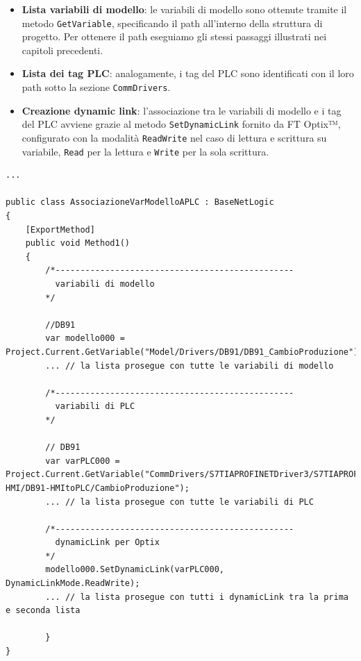 \begin{itemize}
    \item \textbf{Lista variabili di modello}: le variabili di modello sono ottenute tramite il metodo \verb|GetVariable|, specificando il path all'interno della struttura di progetto. Per ottenere il path eseguiamo gli stessi passaggi illustrati nei capitoli precedenti.
    \item \textbf{Lista dei tag PLC}: analogamente, i tag del PLC sono identificati con il loro path sotto la sezione \verb|CommDrivers|.
    \item \textbf{Creazione dynamic link}: l'associazione tra le variabili di modello e i tag del PLC avviene grazie al metodo \verb|SetDynamicLink| fornito da FT Optix™, configurato con la modalità \verb|ReadWrite| nel caso di lettura e scrittura su variabile, \verb|Read| per la lettura e \verb|Write| per la sola scrittura.
\end{itemize}
\begin{verbatim}
...

public class AssociazioneVarModelloAPLC : BaseNetLogic
{
    [ExportMethod]
    public void Method1()
    {
        /*------------------------------------------------
          variabili di modello 
        */
        
        //DB91
        var modello000 = Project.Current.GetVariable("Model/Drivers/DB91/DB91_CambioProduzione");
        ... // la lista prosegue con tutte le variabili di modello

        /*------------------------------------------------
          variabili di PLC
        */

        // DB91
        var varPLC000 = Project.Current.GetVariable("CommDrivers/S7TIAPROFINETDriver3/S7TIAPROFINETStation1/Tags/PRG10021/Standard/90-HMI/DB91-HMItoPLC/CambioProduzione");
        ... // la lista prosegue con tutte le variabili di PLC

        /*------------------------------------------------
          dynamicLink per Optix
        */
        modello000.SetDynamicLink(varPLC000, DynamicLinkMode.ReadWrite);
        ... // la lista prosegue con tutti i dynamicLink tra la prima e seconda lista
        
        }
}
\end{verbatim}
